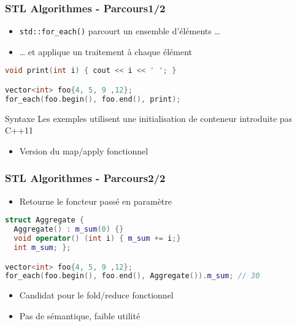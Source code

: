 \documentclass[C++.tex]{subfiles}
\begin{document}
\begin{frame}[fragile]
	\frametitle{STL Algorithmes - Parcours\titlehfill{}1/2}
	\begin{itemize}
		\item \lstinline|std::for_each()| parcourt un ensemble d'éléments \ldots
		\item \ldots{} et applique un traitement à chaque élément
	\end{itemize}

	\begin{lstlisting}[language=C++]
void print(int i) { cout << i << ' '; }

vector<int> foo{4, 5, 9 ,12};
for_each(foo.begin(), foo.end(), print);\end{lstlisting}

	\begin{alertblock}{Syntaxe}
		Les exemples utilisent une initialisation de conteneur introduite pas C++11
	\end{alertblock}

	\begin{itemize}
		\item Version du map/apply fonctionnel
	\end{itemize}
\end{frame}

\begin{frame}[fragile]
	\frametitle{STL Algorithmes - Parcours\titlehfill{}2/2}
	\begin{itemize}
		\item Retourne le foncteur passé en paramètre
	\end{itemize}

	\begin{lstlisting}[language=C++]
struct Aggregate {
  Aggregate() : m_sum(0) {}
  void operator() (int i) { m_sum += i;}
  int m_sum; };

vector<int> foo{4, 5, 9 ,12};
for_each(foo.begin(), foo.end(), Aggregate()).m_sum; // 30\end{lstlisting}

	\begin{itemize}
		\item Candidat pour le fold/reduce fonctionnel
		\item Pas de sémantique, faible utilité

	\end{itemize}
\end{frame}
\end{document}
